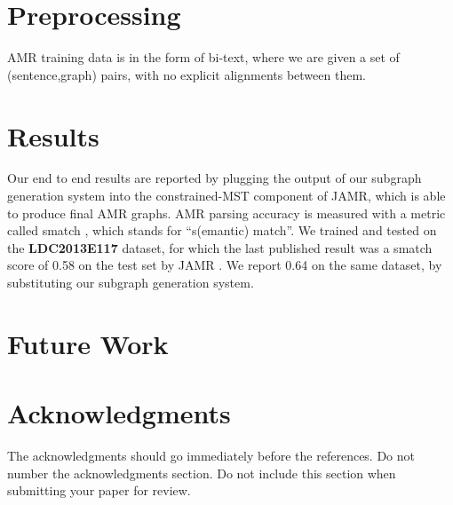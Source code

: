 \documentclass[11pt]{article}
\begin{document}
\section{Preprocessing}

AMR training data is in the form of bi-text, where we are given a set of (sentence,graph) pairs, with no explicit alignments between them.

\section{Results}
Our end to end results are reported by plugging the output of our subgraph generation system into the constrained-MST component of JAMR, which is able to produce final AMR graphs. AMR parsing accuracy is measured with a metric called smatch \needcite, which stands for ``s(emantic) match''. We trained and tested on the \textbf{LDC2013E117} dataset, for which the last published result was a smatch score of 0.58 on the test set by JAMR \cite{Flanigan:14}. We report 0.64 on the same dataset, by substituting our subgraph generation system.


\section{Future Work}

\section*{Acknowledgments}

The acknowledgments should go immediately before the references.  Do
not number the acknowledgments section. Do not include this section
when submitting your paper for review.

%
%
\end{document}

